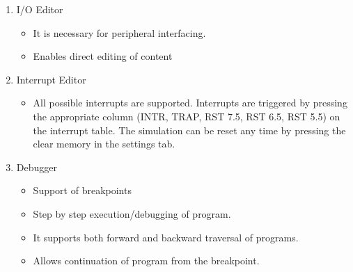\begin{enumerate}
\item I/O Editor
	\begin{itemize}
	\item It is necessary for peripheral interfacing.
	\item Enables direct editing of content
	\end{itemize}
\item Interrupt Editor
	\begin{itemize}
	\item All possible interrupts are supported. Interrupts are triggered by pressing the appropriate column (INTR, TRAP, RST 7.5, RST 6.5, RST 5.5) on the interrupt table. The simulation can be reset any time by pressing the clear memory in the settings tab. 
	\end{itemize}
\item Debugger
	\begin{itemize}
	\item Support of breakpoints
	\item Step by step execution/debugging of program. 
	\item It supports both forward and backward traversal of programs.
	\item Allows continuation of program from the breakpoint.
	\end{itemize}
	

\end{enumerate}
